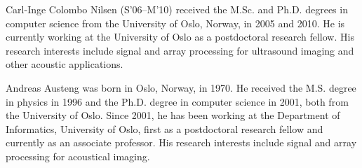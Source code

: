 \documentclass[journal]{IEEEtran}
\begin{document}
\begin{IEEEbiography}{Carl-Inge Colombo Nilsen}
(S’06–M’10) received the M.Sc. and Ph.D. degrees in computer science from the University of Oslo, Norway, in 2005 and 2010. He is currently working at the University of Oslo as a postdoctoral research fellow. His research interests include signal and array processing for ultrasound imaging and other acoustic applications.
\end{IEEEbiography}


\begin{IEEEbiography}{Andreas Austeng}
was born in Oslo, Norway, in 1970. He received the M.S. degree in physics in 1996 and the Ph.D. degree in computer science in 2001, both from the University of Oslo. Since 2001, he has been working at the Department of Informatics, University of Oslo, first as a postdoctoral research fellow and currently as an associate professor. His research interests include signal and array processing for acoustical imaging.
\end{IEEEbiography}

\newpage
\end{document}
